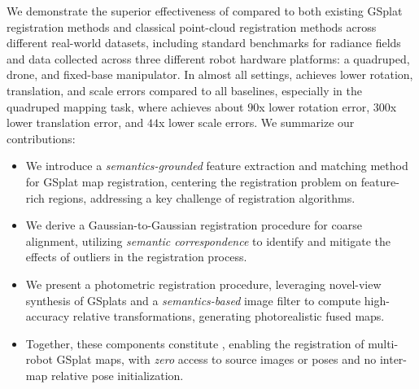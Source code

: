 We demonstrate the superior effectiveness of \algname compared to both existing GSplat registration methods and classical point-cloud registration methods across different real-world datasets, including standard benchmarks for radiance fields and data collected across three different robot hardware platforms: a quadruped, drone, and fixed-base manipulator. In almost all settings, \algname achieves lower rotation, translation, and scale errors compared to all baselines, especially in the quadruped mapping task, where \algname achieves about $90$x lower rotation error, $300$x lower translation error, and $44$x lower scale errors. We summarize our contributions:
\begin{itemize}
    \item We introduce a \emph{semantics-grounded} feature extraction and matching method for GSplat map registration, centering the registration problem on feature-rich regions, addressing a key challenge of registration algorithms.
    \item We derive a Gaussian-to-Gaussian registration procedure for coarse alignment, utilizing \emph{semantic correspondence} to identify and mitigate the effects of outliers in the registration process.
    \item We present a photometric registration procedure, leveraging novel-view synthesis of GSplats and a \emph{semantics-based} image filter to compute high-accuracy relative transformations, generating photorealistic fused maps.
    \item Together, these components constitute \algname, enabling the registration of multi-robot GSplat maps, with \emph{zero} access to source images or poses and no inter-map relative pose initialization.
\end{itemize}
